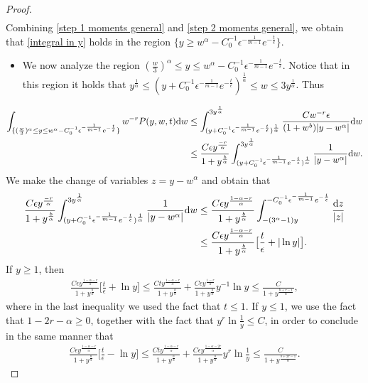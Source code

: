 \documentclass[11pt]{article}
\numberwithin{equation}{section}
\newcommand{\der}{\textup{d}}
\begin{document}
\begin{proof}
\begin{align}
\end{align}
Combining \eqref{step 1 moments general} and \eqref{step 2 moments general}, we obtain that \eqref{integral in y} holds in the region $\{y\geq w^{\alpha}-C_{0}^{-1}\epsilon^{-\frac{1}{m-1}} e^{-\frac{t}{\epsilon}}\}$.
\begin{itemize}
  \item  We now analyze the region $(\frac{w}{3})^{\alpha}\leq y\leq w^{\alpha}-C_{0}^{-1}\epsilon^{-\frac{1}{m-1}}  e^{-\frac{t}{\epsilon}}$. Notice that in this region it holds that $y^{\frac{1}{\alpha}}\leq (y+C_{0}^{-1}\epsilon^{-\frac{1}{m-1}}  e^{-\frac{t}{\epsilon}})^{\frac{1}{\alpha}}\leq w\leq 3y^{\frac{1}{\alpha}}$. Thus
\end{itemize} 
 \begin{align*}
      \int_{\{(\frac{w}{3})^{\alpha}\leq y\leq w^{\alpha}-C_{0}^{-1}\epsilon^{-\frac{1}{m-1}}  e^{-\frac{t}{\epsilon}}\}}w^{-r}P(y,w,t)\der w&\leq \int^{3y^{\frac{1}{\alpha}}}_{(y+C_{0}^{-1}\epsilon^{-\frac{1}{m-1}}  e^{-\frac{t}{\epsilon}})^{\frac{1}{\alpha}}} \frac{Cw^{-r}\epsilon}{(1+w^{b})|y-w^{\alpha}|}\der w\\
      &\leq \frac{C\epsilon y^{\frac{-r}{\alpha}}}{1+y^{\frac{b}{\alpha}}}\int^{3y^{\frac{1}{\alpha}}}_{(y+C_{0}^{-1}\epsilon^{-\frac{1}{m-1}}  e^{-\frac{t}{\epsilon}})^{\frac{1}{\alpha}}} \frac{1}{|y-w^{\alpha}|}\der w.
 \end{align*}
We make the change of variables $z=y-w^{\alpha}$ and obtain that 
\begin{align*}
  \frac{C\epsilon  y^{\frac{-r}{\alpha}}}{1+y^{\frac{b}{\alpha}}}  \int^{3y^{\frac{1}{\alpha}}}_{(y+C_{0}^{-1}\epsilon^{-\frac{1}{m-1}}  e^{-\frac{t}{\epsilon}})^{\frac{1}{\alpha}}} \frac{1}{|y-w^{\alpha}|}\der w&\leq \frac{C\epsilon y^{\frac{1-\alpha-r}{\alpha}}}{1+y^{\frac{b}{\alpha}}}\int_{-(3^{\alpha}-1)y}^{-C_{0}^{-1}\epsilon^{-\frac{1}{m-1}}e^{-\frac{t}{\epsilon}}}\frac{\der z}{|z|}\\
  & \leq \frac{C\epsilon  y^{\frac{1-\alpha-r}{\alpha}}}{1+y^{\frac{b}{\alpha}}}\big[\frac{t}{\epsilon}+|\ln{y}|\big].
\end{align*}
If $y\geq 1$, then
\begin{align*}
  \frac{C\epsilon  y^{\frac{1-\alpha-r}{\alpha}}}{1+y^{\frac{b}{\alpha}}}\big[\frac{t}{\epsilon}+\ln{y}\big]  \leq\frac{Ct  y^{\frac{1-\alpha-r}{\alpha}}}{1+y^{\frac{b}{\alpha}}}+\frac{C\epsilon  y^{\frac{1-r}{\alpha}}}{1+y^{\frac{b}{\alpha}}}y^{-1}\ln{y}\leq \frac{C}{1+y^{\frac{b+r-1}{\alpha}}},
\end{align*}
where in the last inequality we used the fact that $t\leq 1$.
If $y\leq 1$, we use the fact that $1-2r-\alpha\geq 0$, together with the fact that $y^{r}\ln \frac{1}{y}\leq C$, in order to conclude in the same manner that
\begin{align*}
     \frac{C\epsilon y^{\frac{1-\alpha-r}{\alpha}}}{1+y^{\frac{b}{\alpha}}}\big[\frac{t}{\epsilon}-\ln{y}\big] \leq  \frac{Ct y^{\frac{1-\alpha-r}{\alpha}}}{1+y^{\frac{b}{\alpha}}}+\frac{C\epsilon y^{\frac{1-\alpha-2r}{\alpha}}}{1+y^{\frac{b}{\alpha}}}y^{r}\ln{\frac{1}{y}}  \leq \frac{C}{1+y^{\frac{b+2r-1}{\alpha}}}.
\end{align*}


\end{proof}
\end{document}
